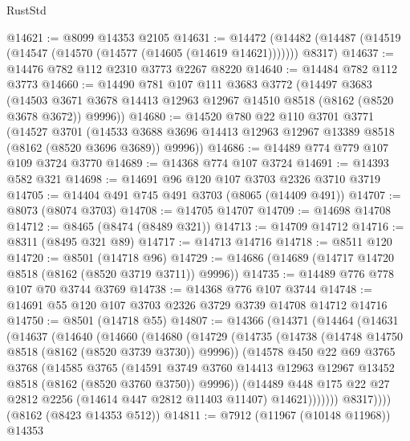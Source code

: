 \begin{lexlean}{RustStd}
\begin{coremodule}
@14621 := @8099 @14353 @2105
@14631 := @14472
    (@14482 (@14487 (@14519 (@14547 (@14570 (@14577 (@14605 (@14619 @14621))))))) @8317)
@14637 := @14476 @782 @112 @2310 @3773 @2267 @8220
@14640 := @14484 @782 @112 @3773
@14660 := @14490
    @781
    @107
    @111
    @3683
    @3772
    (@14497
      @3683
      (@14503 @3671 @3678 @14413 @12963 @12967 @14510 @8518 (@8162 (@8520 @3678 @3672)) @9996))
@14680 := @14520
    @780
    @22
    @110
    @3701
    @3771
    (@14527
      @3701
      (@14533 @3688 @3696 @14413 @12963 @12967 @13389 @8518 (@8162 (@8520 @3696 @3689)) @9996))
@14686 := @14489 @774 @779 @107 @109 @3724 @3770
@14689 := @14368 @774 @107 @3724
@14691 := @14393 @582 @321
@14698 := @14691 @96 @120 @107 @3703 @2326 @3710 @3719
@14705 := @14404 @491 @745 @491 @3703 (@8065 (@14409 @491))
@14707 := @8073 (@8074 @3703)
@14708 := @14705 @14707
@14709 := @14698 @14708
@14712 := @8465 (@8474 (@8489 @321))
@14713 := @14709 @14712
@14716 := @8311 (@8495 @321 @89)
@14717 := @14713 @14716
@14718 := @8511 @120
@14720 := @8501 (@14718 @96)
@14729 := @14686 (@14689 (@14717 @14720 @8518 (@8162 (@8520 @3719 @3711)) @9996))
@14735 := @14489 @776 @778 @107 @70 @3744 @3769
@14738 := @14368 @776 @107 @3744
@14748 := @14691 @55 @120 @107 @3703 @2326 @3729 @3739 @14708 @14712 @14716
@14750 := @8501 (@14718 @55)
@14807 := @14366
    (@14371
      (@14464
        (@14631
          (@14637
            (@14640
              (@14660
                (@14680
                  (@14729
                    (@14735
                      (@14738 (@14748 @14750 @8518 (@8162 (@8520 @3739 @3730)) @9996))
                      (@14578
                        @450
                        @22
                        @69
                        @3765
                        @3768
                        (@14585
                          @3765
                          (@14591
                            @3749
                            @3760
                            @14413
                            @12963
                            @12967
                            @13452
                            @8518
                            (@8162 (@8520 @3760 @3750))
                            @9996))
                        (@14489
                          @448
                          @175
                          @22
                          @27
                          @2812
                          @2256
                          (@14614 @447 @2812 @11403 @11407)
                          @14621)))))))
            @8317))))
    (@8162 (@8423 @14353 @512))
@14811 := @7912 (@11967 (@10148 @11968)) @14353

\end{coremodule}
\end{lexlean}
